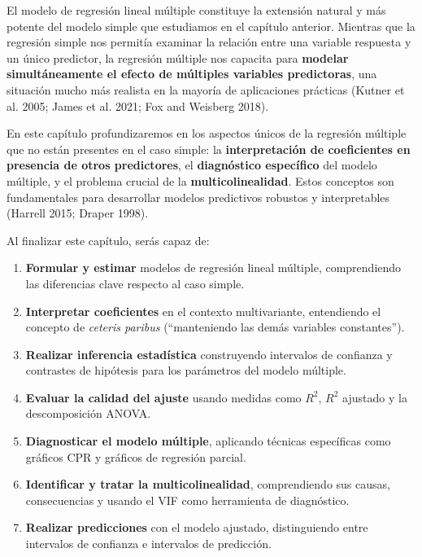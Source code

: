 \documentclass[
  letterpaper,
  DIV=11,
  numbers=noendperiod]{scrreprt}
\providecommand{\tightlist}{%
  \setlength{\itemsep}{0pt}\setlength{\parskip}{0pt}}
\begin{document}
El modelo de regresión lineal múltiple constituye la extensión natural y
más potente del modelo simple que estudiamos en el capítulo anterior.
Mientras que la regresión simple nos permitía examinar la relación entre
una variable respuesta y un único predictor, la regresión múltiple nos
capacita para \textbf{modelar simultáneamente el efecto de múltiples
variables predictoras}, una situación mucho más realista en la mayoría
de aplicaciones prácticas (Kutner et al. 2005; James et al. 2021; Fox
and Weisberg 2018).

En este capítulo profundizaremos en los aspectos únicos de la regresión
múltiple que no están presentes en el caso simple: la
\textbf{interpretación de coeficientes en presencia de otros
predictores}, el \textbf{diagnóstico específico} del modelo múltiple, y
el problema crucial de la \textbf{multicolinealidad}. Estos conceptos
son fundamentales para desarrollar modelos predictivos robustos y
interpretables (Harrell 2015; Draper 1998).

\begin{tcolorbox}[enhanced jigsaw, leftrule=.75mm, breakable, colbacktitle=quarto-callout-important-color!10!white, bottomrule=.15mm, colframe=quarto-callout-important-color-frame, toprule=.15mm, colback=white, coltitle=black, bottomtitle=1mm, left=2mm, title=\textcolor{quarto-callout-important-color}{\faExclamation}\hspace{0.5em}{Objetivos de aprendizaje}, opacityback=0, arc=.35mm, opacitybacktitle=0.6, toptitle=1mm, titlerule=0mm, rightrule=.15mm]

Al finalizar este capítulo, serás capaz de:

\begin{enumerate}
\def\labelenumi{\arabic{enumi}.}
\tightlist
\item
  \textbf{Formular y estimar} modelos de regresión lineal múltiple,
  comprendiendo las diferencias clave respecto al caso simple.
\item
  \textbf{Interpretar coeficientes} en el contexto multivariante,
  entendiendo el concepto de \emph{ceteris paribus} (``manteniendo las
  demás variables constantes'').
\item
  \textbf{Realizar inferencia estadística} construyendo intervalos de
  confianza y contrastes de hipótesis para los parámetros del modelo
  múltiple.
\item
  \textbf{Evaluar la calidad del ajuste} usando medidas como \(R^2\),
  \(R^2\) ajustado y la descomposición ANOVA.
\item
  \textbf{Diagnosticar el modelo múltiple}, aplicando técnicas
  específicas como gráficos CPR y gráficos de regresión parcial.
\item
  \textbf{Identificar y tratar la multicolinealidad}, comprendiendo sus
  causas, consecuencias y usando el VIF como herramienta de diagnóstico.
\item
  \textbf{Realizar predicciones} con el modelo ajustado, distinguiendo
  entre intervalos de confianza e intervalos de predicción.
\end{enumerate}

\end{tcolorbox}
\end{document}
